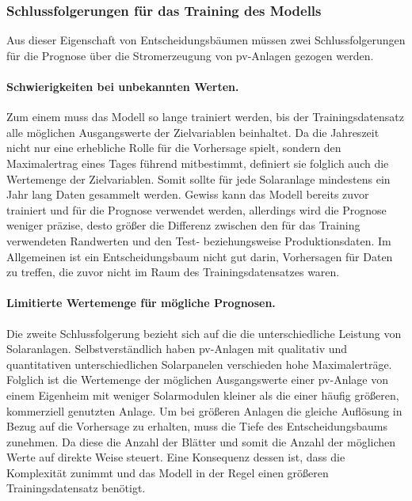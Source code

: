 \documentclass[12pt, a4paper]{article}
\begin{document}
\subsubsection{Schlussfolgerungen für das Training des Modells}
\label{subsubsec:conclusion_for_training}

Aus dieser Eigenschaft von Entscheidungsbäumen müssen zwei Schlussfolgerungen für die Prognose über die Stromerzeugung von \ac{pv}-Anlagen gezogen werden. 

\paragraph{Schwierigkeiten bei unbekannten Werten.} 

Zum einem muss das Modell so lange trainiert werden, bis der Trainingsdatensatz alle möglichen Ausgangswerte der Zielvariablen beinhaltet. Da die Jahreszeit nicht nur eine erhebliche Rolle für die Vorhersage spielt, sondern den Maximalertrag eines Tages führend mitbestimmt, definiert sie folglich auch die Wertemenge der Zielvariablen. Somit sollte für jede Solaranlage mindestens ein Jahr lang Daten gesammelt werden. Gewiss kann das Modell bereits zuvor trainiert und für die Prognose verwendet werden, allerdings wird die Prognose weniger präzise, desto größer die Differenz zwischen den für das Training verwendeten Randwerten und den Test- beziehungsweise Produktionsdaten. Im Allgemeinen ist ein Entscheidungsbaum nicht gut darin, Vorhersagen für Daten zu treffen, die zuvor nicht im Raum des Trainingsdatensatzes waren.

\paragraph{Limitierte Wertemenge für mögliche Prognosen.}

Die zweite Schlussfolgerung bezieht sich auf die die unterschiedliche Leistung von Solaranlagen. Selbstverständlich haben \ac{pv}-Anlagen mit qualitativ und quantitativen unterschiedlichen Solarpanelen verschieden hohe Maximalerträge. Folglich ist die Wertemenge der möglichen Ausgangswerte einer \ac{pv}-Anlage von einem Eigenheim mit weniger Solarmodulen kleiner als die einer häufig größeren, kommerziell genutzten Anlage. Um bei größeren Anlagen die gleiche Auflösung in Bezug auf die Vorhersage zu erhalten, muss die Tiefe des Entscheidungsbaums zunehmen. Da diese die Anzahl der Blätter und somit die Anzahl der möglichen Werte auf direkte Weise steuert. Eine Konsequenz dessen ist, dass die Komplexität zunimmt und das Modell in der Regel einen größeren Trainingsdatensatz benötigt.
\end{document}
